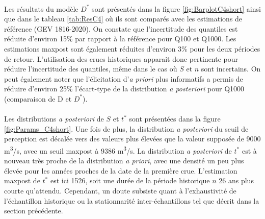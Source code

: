 	\paragraph{} Les résultats du modèle $D^*$ sont présentés dans la figure \ref{fig:BarplotC4short} ainsi que dans le tableau \ref{tab:ResC4} où ils sont comparés avec les estimations de référence (GEV 1816-2020). On constate que l'incertitude des quantiles est réduite d'environ 15\% par rapport à la référence pour Q100 et Q1000. Les estimations maxpost sont également réduites d'environ 3\% pour les deux périodes de retour. L'utilisation des crues historiques apparait donc pertinente pour réduire l'incertitude des quantiles, même dans le cas où $S$ et $n$ sont incertains. On peut également noter que l'élicitation d'\textit{a priori} plus informatifs a permis de réduire d'environ 25\% l'écart-type de la distribution \textit{a posteriori} pour Q1000 (comparaison de D et $D^*$). 

%
%
		
	\paragraph{} Les distributions \textit{a posteriori} de $S$ et $t^{*}$ sont présentées dans la figure \ref{fig:Params_C4short}. Une fois de plus, la distribution \textit{a posteriori} du seuil de perception est décalée vers des valeurs plus élevées que la valeur supposée de 9000 m\textsuperscript{3}/s, avec un seuil maxpost à 9386 m\textsuperscript{3}/s. La distribution \textit{a posteriori} de $t^{*}$ est à nouveau très proche de la distribution \textit{a priori}, avec une densité un peu plus élevée pour les années proches de la date de la première crue. L'estimation maxpost de $t^{*}$ est ici 1526, soit une durée de la période historique $n$ 26 ans plus courte qu'attendu. Cependant, un doute subsiste quant à l'exhaustivité de l'échantillon historique ou la stationnarité inter-échantillons tel que décrit dans la section précédente.
			
